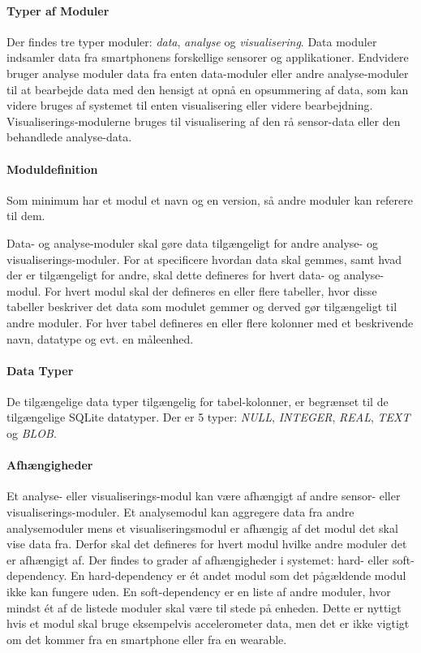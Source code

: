 \paragraph{Typer af Moduler}
Der findes tre typer moduler: \textit{data}, \textit{analyse} og \textit{visualisering}.
Data moduler indsamler data fra smartphonens forskellige sensorer og applikationer.
Endvidere bruger analyse moduler data fra enten data-moduler eller andre analyse-moduler til at bearbejde data med den hensigt at opnå en opsummering af data, som kan videre bruges af systemet til enten visualisering eller videre bearbejdning.
Visualiserings-modulerne bruges til visualisering af den rå sensor-data eller den behandlede analyse-data.

\paragraph{Moduldefinition}
Som minimum har et modul et navn og en version, så andre moduler kan referere til dem.

Data- og analyse-moduler skal gøre data tilgængeligt for andre analyse- og visualiserings-moduler.
For at specificere hvordan data skal gemmes, samt hvad der er tilgængeligt for andre, skal dette defineres for hvert data- og analyse-modul.
For hvert modul skal der defineres en eller flere tabeller, hvor disse tabeller beskriver det data som modulet gemmer og derved gør tilgængeligt til andre moduler.
For hver tabel defineres en eller flere kolonner med et beskrivende navn, datatype og evt. en måleenhed.

\paragraph{Data Typer}
De tilgængelige data typer tilgængelig for tabel-kolonner, er begrænset til de tilgængelige SQLite datatyper.
Der er 5 typer: \textit{NULL}, \textit{INTEGER}, \textit{REAL}, \textit{TEXT} og \textit{BLOB}.

\paragraph{Afhængigheder}
Et analyse- eller visualiserings-modul kan være afhængigt af andre sensor- eller visualiserings-moduler.
Et analysemodul kan aggregere data fra andre analysemoduler mens et visualiseringsmodul er afhængig af det modul det skal vise data fra.
Derfor skal det defineres for hvert modul hvilke andre moduler det er afhængigt af.
Der findes to grader af afhængigheder i systemet: hard- eller soft-dependency.
En hard-dependency er ét andet modul som det pågældende modul ikke kan fungere uden.
En soft-dependency er en liste af andre moduler, hvor mindst ét af de listede moduler skal være til stede på enheden.
Dette er nyttigt hvis et modul skal bruge eksempelvis accelerometer data, men det er ikke vigtigt om det kommer fra en smartphone eller fra en wearable.

